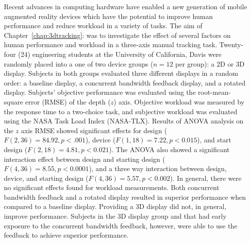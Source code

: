 Recent advances in computing hardware have enabled a new generation of mobile augmented reality devices which have the potential to improve human performance and reduce workload in a variety of tasks.
The aim of Chapter~\ref{chap:3dtracking}:  was to investigate the effect of several factors on human performance and workload in a three-axis manual tracking task.
Twenty-four (24) engineering students at the University of California, Davis were randomly placed into a one of two device groups ($n=12$ per group): a 2D or 3D display.
Subjects in both groups evaluated three different displays in a random order: a baseline display, a concurrent bandwidth feedback display, and a rotated display.
Subjects' objective performance was evaluated using the root-mean-square error (RMSE) of the depth ($z$) axis.
Objective workload was measured by the response time to a two-choice task, and subjective workload was evaluated using the NASA Task Load Index (NASA-TLX).
Results of ANOVA analysis on the $z$ axis RMSE showed significant effects for design ($F(2, 36)=84.92, p<.001$), device ($F(1, 18)=7.22, p<0.015$), and start design ($F(2, 18)=4.81, p<0.021$).
The ANOVA also showed a significant interaction effect between design and starting design ($F(4, 36)=8.55, p<0.0001$), and a three way interaction between design, device, and starting design ($F(4, 36)=5.57, p<0.002$).
In general, there were no significant effects found for workload measurements.
Both concurrent bandwidth feedback and a rotated display resulted in superior performance when compared to a baseline display.
Providing a 3D display did not, in general, improve performance.
Subjects in the 3D display group and that had early exposure to the concurrent bandwidth feedback, however, were able to use the feedback to achieve superior performance.

